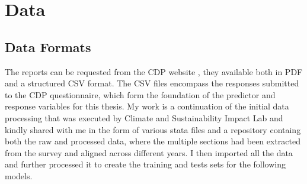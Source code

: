 \chapter{Data}

\section{Data Formats}

\noindent The reports can be requested from the CDP website \cite{CDPMain2024}, they available both in PDF and a structured CSV format. The CSV files encompass the responses submitted to the CDP questionnaire, which form the foundation of the predictor and response variables for this thesis. My work is a continuation of the initial data processing that was executed by Climate and Sustainability Impact Lab \cite{HarvardD3Lab2024} and kindly shared with me in the form of various stata files and a repository containg both the raw and processed data, where the multiple sections had been extracted from the survey and aligned across different years. I then imported all the data and further processed it to create the training and tests sets for the following models. 

